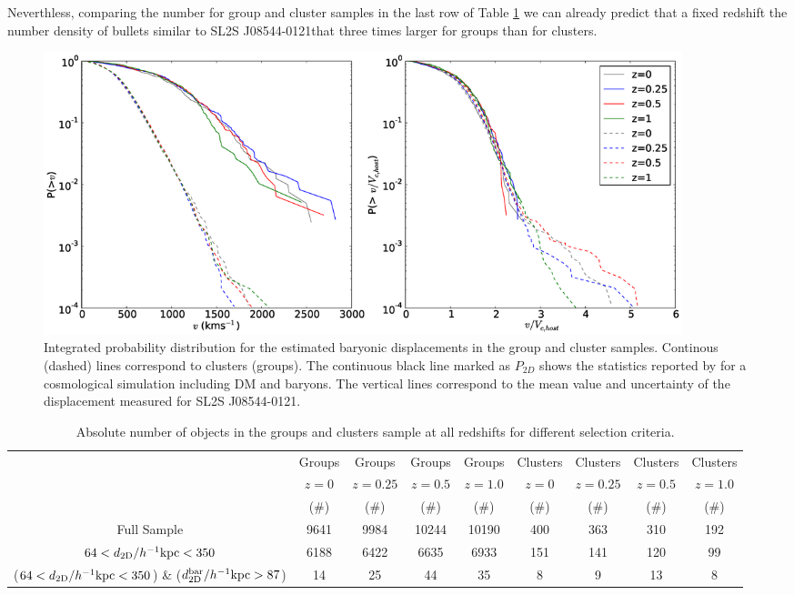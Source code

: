 \documentclass{emulateapj}
\newcommand{\hkpc}{{\ifmmode{h^{-1}{\rm kpc}}\else{$h^{-1}$kpc }\fi}}
\newcommand{\bullg}{SL2S J08544-0121}
\begin{document}
Neverthless, comparing the number for group and cluster samples in the
last row of Table \ref{table:numbers} we can already predict that a
fixed redshift the number density of bullets similar to \bullg that
three times larger for groups than for clusters.   




\begin{figure}
\begin{center}
\includegraphics[width=0.9\textwidth]{figure_3.eps}
\end{center}
\caption{Integrated probability distribution for the estimated
  baryonic displacements in the group and cluster samples. Continous (dashed)
  lines correspond to clusters (groups). The continuous black line
  marked as $P_{2D}$ shows the statistics reported by
  \citet{ForeroRomero2010} for a cosmological simulation including DM
  and baryons. The vertical lines correspond to the mean value and
  uncertainty of the displacement measured for \bullg.} 
\label{fig:baryonic_displacements}
\end{figure}

  
\begin{table}
\begin{center}
\begin{tabular}{ccccccccc}\hline\hline
        & Groups & Groups & Groups & Groups & Clusters & Clusters & Clusters & Clusters\\
  & $z=0$   & $z=0.25$   & $z=0.5$   & $z=1.0$   & $z=0$   & $z=0.25$   & $z=0.5$   & $z=1.0$ \\
  & ($\# $)    & ($\# $)    & ($\# $)    & ($\# $)    & ($\# $)    & ($\# $)    & ($\# $)    & ($\# $)  \\\hline
Full Sample & 9641 & 9984 & 10244 & 10190 & 400  & 363 & 310 & 192 \\
$64 <d_{\rm 2D}/\hkpc< 350$ & 6188 & 6422 & 6635 & 6933 & 151 &
141 & 120 & 99\\
($64 <d_{\rm 2D}/\hkpc< 350 $) \& ($d_{\rm 2D}^{\rm bar}/\hkpc >87$) & 14 & 25 & 44 & 35 & 8 & 9 & 13 & 8 \\\hline\hline
\end{tabular}
\caption{Absolute number of objects in the groups and clusters sample
  at all redshifts for different selection criteria. }
\label{table:numbers}
\end{center}
\end{table}
\end{document}
